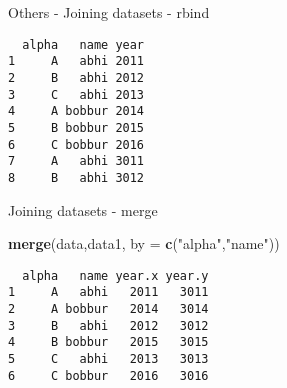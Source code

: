 \documentclass[ignorenonframetext,]{beamer}
\newenvironment{Shaded}{\begin{snugshade}}{\end{snugshade}}
\newcommand{\DataTypeTok}[1]{\textcolor[rgb]{0.13,0.29,0.53}{#1}}
\newcommand{\DecValTok}[1]{\textcolor[rgb]{0.00,0.00,0.81}{#1}}
\newcommand{\KeywordTok}[1]{\textcolor[rgb]{0.13,0.29,0.53}{\textbf{#1}}}
\newcommand{\NormalTok}[1]{#1}
\newcommand{\OperatorTok}[1]{\textcolor[rgb]{0.81,0.36,0.00}{\textbf{#1}}}
\newcommand{\StringTok}[1]{\textcolor[rgb]{0.31,0.60,0.02}{#1}}
\begin{document}
\begin{frame}[fragile]{Others - Joining datasets - rbind}
\protect\hypertarget{others---joining-datasets---rbind}{}

\begin{Shaded}
\end{Shaded}

\begin{verbatim}
  alpha   name year
1     A   abhi 2011
2     B   abhi 2012
3     C   abhi 2013
4     A bobbur 2014
5     B bobbur 2015
6     C bobbur 2016
7     A   abhi 3011
8     B   abhi 3012
\end{verbatim}

\end{frame}

\begin{frame}[fragile]{Joining datasets - merge}
\protect\hypertarget{joining-datasets---merge}{}

\begin{Shaded}
\begin{Highlighting}[]
\KeywordTok{merge}\NormalTok{(data,data1, }\DataTypeTok{by =} \KeywordTok{c}\NormalTok{(}\StringTok{"alpha"}\NormalTok{,}\StringTok{"name"}\NormalTok{))}
\end{Highlighting}
\end{Shaded}

\begin{verbatim}
  alpha   name year.x year.y
1     A   abhi   2011   3011
2     A bobbur   2014   3014
3     B   abhi   2012   3012
4     B bobbur   2015   3015
5     C   abhi   2013   3013
6     C bobbur   2016   3016
\end{verbatim}

\end{frame}
\end{document}
